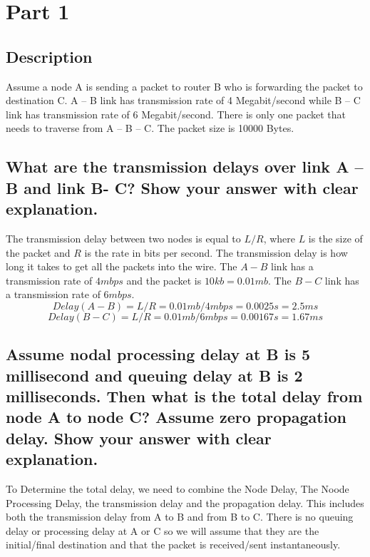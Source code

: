 \documentclass{assignment-x}
\begin{document}
\maketitle

\pagebreak
\section{Part 1}
\subsection{Description}
Assume a node A is sending a packet to router B who is forwarding the packet to destination C. A – B link has transmission rate of 4 Megabit/second while B – C link has transmission rate of 6 Megabit/second. There is only one packet that needs to traverse from A – B – C. The packet size is 10000 Bytes.


\subsection{What are the transmission delays over link A – B and link B- C? Show your answer with clear explanation.}
The transmission delay between two nodes is equal to $L/R$, where $L$ is the size of the packet and $R$ is the rate in bits per second. The transmission delay is how long it takes to get all the packets into the wire. The $A-B$ link has a transmission rate of $4mbps$ and the packet is $10kb = 0.01mb$. The $B-C$ link has a transmission rate of $6mbps$. 
$$Delay(A-B) = L/R=0.01mb/4mbps= 0.0025s = 2.5ms$$
$$Delay(B-C) = L/R=0.01mb/6mbps=0.00167s = 1.67ms$$


\subsection{Assume nodal processing delay at B is 5 millisecond and queuing delay at B is 2 milliseconds. Then what is the total delay from node A to node C? Assume zero propagation delay. Show your answer with clear explanation.}

To Determine the total delay, we need to combine the Node Delay, The Noode Processing Delay, the transmission delay and the propagation delay. This includes both the transmission delay from A to B and from B to C. There is no queuing delay or processing delay at A or C so we will assume that they are the initial/final destination and that the packet is received/sent instantaneously.
\end{document}
